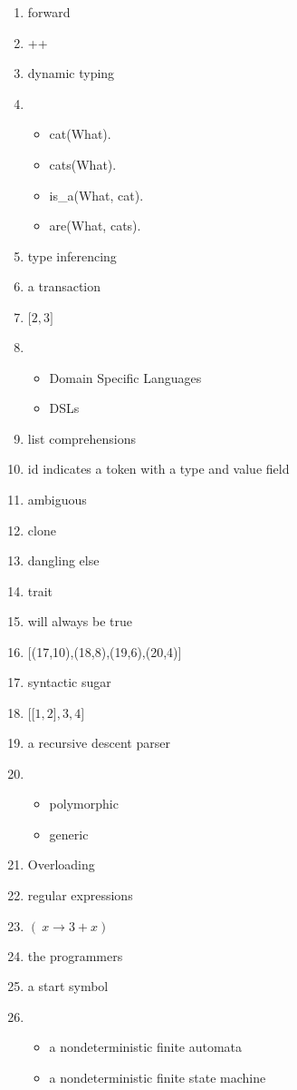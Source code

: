 \documentclass{exam}
\begin{document}
\begin{enumerate}
\item forward
\item ++
\item dynamic typing
\item \begin{itemize}
\item cat(What).
\item cats(What).
\item is\_a(What, cat).
\item are(What, cats).
\end{itemize}
\item type inferencing
\item a transaction
\item $\lbrack 2, 3\rbrack$
\item \begin{itemize}
\item Domain Specific Languages
\item DSLs
\end{itemize}
\item list comprehensions
\item id indicates a token with a type and value field
\item ambiguous
\item clone
\item dangling else
\item trait
\item will always be true
\item $\lbrack$(17,10),(18,8),(19,6),(20,4)$\rbrack$
\item syntactic sugar
\item $\lbrack \lbrack 1, 2\rbrack, 3, 4\rbrack$
\item a recursive descent parser
\item \begin{itemize}
\item polymorphic
\item generic
\end{itemize}
\item Overloading
\item regular expressions
\item $(\ x \rightarrow 3 + x)$
\item the programmers
\item a start symbol
\item \begin{itemize}
\item a nondeterministic finite automata
\item a nondeterministic finite state machine

\end{itemize}
\end{enumerate}
\end{document}
